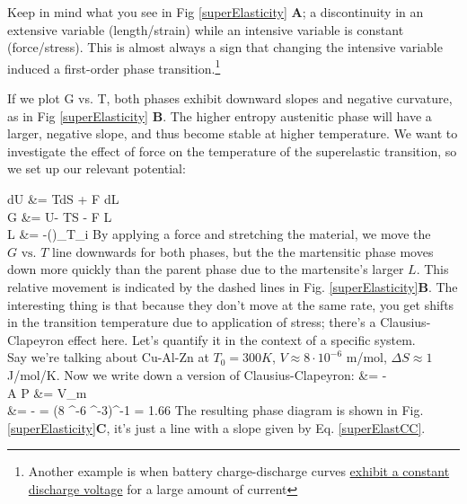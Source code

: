 \documentclass[12pt]{article}
\begin{document}
Keep in mind what you see in Fig \ref{superElasticity} \textbf{A}; a discontinuity in an extensive variable (length/strain) while an intensive variable is constant (force/stress). This is almost always a sign that changing the intensive variable induced a first-order phase transition.\footnote{Another example is when battery charge-discharge curves \href{http://i.stack.imgur.com/UkodS.gif}{exhibit a constant discharge voltage} for a large amount of current}

If we plot G vs. T, both phases exhibit downward slopes and negative curvature, as in Fig \ref{superElasticity} \textbf{B}. The higher entropy austenitic phase will have a larger, negative slope, and thus become stable at higher temperature. We want to investigate the effect of force on the temperature of the superelastic transition, so we set up our relevant potential:

\eqs
dU &= TdS + F dL\\
G &= U- T\cdot S - F \cdot L\\
L &= -\left(\right)_{T_i}
\eqe
By applying a force and stretching the material, we move the $G\text{ vs. }T$ line downwards for both phases, but the the martensitic phase moves down more quickly than the parent phase due to the martensite's larger $L$. This relative movement is indicated by the dashed lines in Fig. \ref{superElasticity}\textbf{B}. The interesting thing is that because they don't move at the same rate, you get shifts in the transition temperature due to application of stress; there's a Clausius-Clapeyron effect here. Let's quantify it in the context of a specific system.\\

Say we're talking about Cu-Al-Zn at $T_0 = 300K$, $V \approx 8 \cdot 10^{-6}$ m\three/mol, $\Delta S \approx 1$ J/mol/K.  Now we write down a version of Clausius-Clapeyron:
\eqs
{}  &= -\\
A \Delta P &= V_m \Delta \epsilon\\
 &= - = (8 ^-6  ^{-3})^{-1} = 1.66 
\label{superElastCC}
\eqe
The resulting phase diagram is shown in Fig. \ref{superElasticity}\textbf{C}, it's just a line with a slope given by Eq. \ref{superElastCC}.
\end{document}
